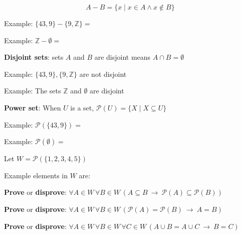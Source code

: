 \documentclass[12pt, oneside]{article}
\begin{document}
\[
    A -  B = \{ x \mid x \in A  \wedge x \notin B \}
\]

Example: $\{43, 9\} - \{9, \mathbb{Z}\}  = $

Example: $\mathbb{Z} - \emptyset  = $

    
{\bf Disjoint sets}: sets $A$ and  $B$ are disjoint means $A \cap  B  = \emptyset$

Example: $\{43, 9\}, \{9, \mathbb{Z}\}$ are not  disjoint 

Example: The sets $\mathbb{Z}$ and $\emptyset$ are disjoint

    

{\bf Power set}: When $U$ is a set, $\mathcal{P}(U) = \{ X \mid X \subseteq U\}$

Example: $\mathcal{P}(\{43, 9\}) = $

Example: $\mathcal{P}(\emptyset) = $
 

Let $W =  \mathcal{P}(  \{ 1,2,3,4,5\} )$

Example elements in $W$ are:
\vspace{20pt}


{\bf Prove} or {\bf  disprove}:  $\forall  A \in W\,  \forall B \in W\,  \left( A \subseteq B
~\to ~ \mathcal{P}(A) \subseteq \mathcal{P}(B) \right)$

\vfill
\vfill
\vfill

{\bf Prove} or {\bf  disprove}:  $\forall  A \in W\,  \forall B \in W\,  \left( \mathcal{P}(A)  =\mathcal{P}(B)
~\to ~ A = B \right)$

\vfill
\vfill

{\bf Prove} or {\bf  disprove}:  $\forall  A \in W\,  \forall B \in W\, \forall C  \in W\,  \left( A\cup B  = A \cup  C
~\to ~ B = C \right)$

\vfill
\vfill 
\end{document}
